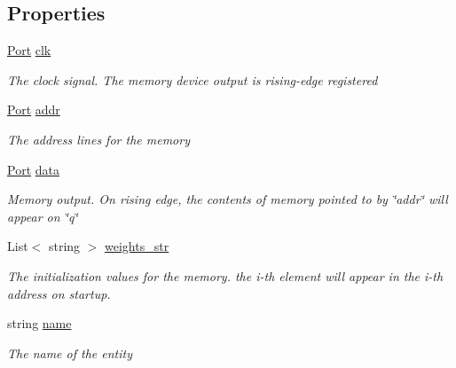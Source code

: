 \subsection*{Properties}
\begin{DoxyCompactItemize}
\item 
\hyperlink{class_n_n_gen_1_1_port}{Port} \hyperlink{class_n_n_gen_1_1_weight_memory_afd016b54cfb5b510f02e5e9d47dd0292}{clk}
\begin{DoxyCompactList}\small\item\em The clock signal. The memory device output is rising-\/edge registered \end{DoxyCompactList}\item 
\hyperlink{class_n_n_gen_1_1_port}{Port} \hyperlink{class_n_n_gen_1_1_weight_memory_a86f72ffc5ccc873778854121075a52da}{addr}
\begin{DoxyCompactList}\small\item\em The address lines for the memory \end{DoxyCompactList}\item 
\hyperlink{class_n_n_gen_1_1_port}{Port} \hyperlink{class_n_n_gen_1_1_weight_memory_a83826d4cceec2993daebe283204e12b6}{data}
\begin{DoxyCompactList}\small\item\em Memory output. On rising edge, the contents of memory pointed to by \char`\"{}addr\char`\"{} will appear on \char`\"{}q\char`\"{} \end{DoxyCompactList}\item 
List$<$ string $>$ \hyperlink{class_n_n_gen_1_1_weight_memory_a969c7f7f162b75653ff1cb94eb1d11a8}{weights\+\_\+str}
\begin{DoxyCompactList}\small\item\em The initialization values for the memory. the i-\/th element will appear in the i-\/th address on startup. \end{DoxyCompactList}\item 
string \hyperlink{class_n_n_gen_1_1_weight_memory_a4b89726fb6f1303d0b898f29d28545cc}{name}
\begin{DoxyCompactList}\small\item\em The name of the entity \end{DoxyCompactList}\end{DoxyCompactItemize}



